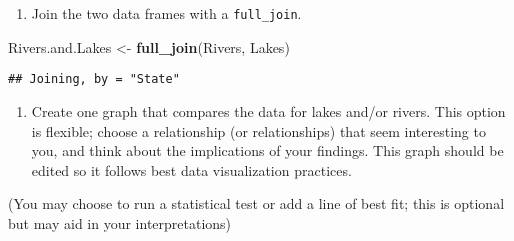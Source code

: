 \documentclass[]{article}
\newenvironment{Shaded}{\begin{snugshade}}{\end{snugshade}}
\newcommand{\KeywordTok}[1]{\textcolor[rgb]{0.13,0.29,0.53}{\textbf{#1}}}
\newcommand{\NormalTok}[1]{#1}
\newcommand{\StringTok}[1]{\textcolor[rgb]{0.31,0.60,0.02}{#1}}
\providecommand{\tightlist}{%
  \setlength{\itemsep}{0pt}\setlength{\parskip}{0pt}}
\begin{document}
\begin{enumerate}
\def\labelenumi{\arabic{enumi}.}
\setcounter{enumi}{9}
\tightlist
\item
  Join the two data frames with a \texttt{full\_join}.
\end{enumerate}

\begin{Shaded}
\begin{Highlighting}[]
\NormalTok{Rivers.and.Lakes <-}\StringTok{ }\KeywordTok{full_join}\NormalTok{(Rivers, Lakes)}
\end{Highlighting}
\end{Shaded}

\begin{verbatim}
## Joining, by = "State"
\end{verbatim}

\begin{enumerate}
\def\labelenumi{\arabic{enumi}.}
\setcounter{enumi}{10}
\tightlist
\item
  Create one graph that compares the data for lakes and/or rivers. This
  option is flexible; choose a relationship (or relationships) that seem
  interesting to you, and think about the implications of your findings.
  This graph should be edited so it follows best data visualization
  practices.
\end{enumerate}

(You may choose to run a statistical test or add a line of best fit;
this is optional but may aid in your interpretations)
\end{document}
